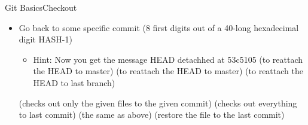 \begin{frame}{Git Basics}{Checkout}
\begin{itemize}
\item Go back to some specific commit
 (8 first digits out of a 40-long hexadecimal digit HASH-1)
\begin{itemize}
\item Hint: Now you get the message {\color{red} HEAD detachhed at 53c5105}
   (to reattach the HEAD to master)
   (to reattach the HEAD to master)
   (to reattach the HEAD to last branch)
\end{itemize}
   (checks out only the given files to the given commit)
   (checks out everything to last commit)
   (the same as above)
   (restore the file to the last commit)
\end{itemize}
\end{frame}
